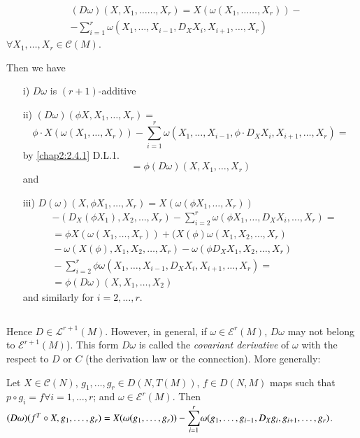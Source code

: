 \begin{align*}
& (D\omega)(X,X_{1},\ldots\ldots,X_{r})=X(\omega(X_{1},\ldots\ldots,X_{r}))-\\
& -\sum^{r}_{i=1}\omega (X_{1},\ldots,X_{i-1},D_{X}X_{i},X_{i+1},\ldots,X_{r})
\end{align*}
$\forall X_{1},\ldots,X_{r}\in\mathscr{C}(M)$.

Then \pageoriginale we have
\begin{itemize}
\item[i)] $D\omega$ is $(r+1)$-additive

\item[ii)] $(D\omega)(\phi X,X_{1},\ldots,X_{r})=$
$$
\phi\cdot
X(\omega(X_{1},\ldots,X_{r}))-\sum^{r}_{i=1}\omega(X_{1},\ldots,X_{i-1},\phi\cdot D_{X}X_{i},X_{i+1},\ldots,X_{r})=
$$
by \ref{chap2:2.4.1} D.L.1.
$$
=\phi(D\omega)(X,X_{1},\ldots,X_{r})
$$
and

\item[iii)] $D(\omega)(X,\phi X_{1},\ldots,X_{r})=X(\omega(\phi
  X_{1},\ldots,X_{r}))$
\begin{align*}
&-(D_{X}(\phi X_{1}),X_{2},\ldots,X_{r})-\sum^{r}_{i=2}\omega(\phi
X_{1},\ldots,D_{X}X_{i},\ldots,X_{r})=\\
&=\phi
X(\omega(X_{1},\ldots,X_{r}))+(X(\phi)\omega(X_{1},X_{2},\ldots,X_{r})\\
&{}-\omega(X(\phi),X_{1},X_{2},\ldots,X_{r})
-\omega(\phi D_{X}X_{1},X_{2},\ldots,X_{r})\\
&{}-\sum^{r}_{i=2}\phi\omega(X_{1},\ldots,X_{i-1},D_{X}X_{i},X_{i+1},\ldots,X_{r})=\\
&=\phi(D\omega)(X,X_{1},\ldots,X_{2})
\end{align*}
and similarly for $i=2,\ldots,r$.
\end{itemize}

\setcounter{subsection}{6}
\subsection{}\label{chap2:2.4.7}
Hence $D\in \mathscr{L}^{r+1}(M)$. However, in general, if $\omega\in
\mathcal{E}^{r}(M)$, $D\omega$ may not belong to
$\mathcal{E}^{r+1}(M)$). This form $D\omega$ is called the {\em
  covariant derivative} of $\omega$ with the respect to $D$ or $C$
(the derivation law or the connection). More generally:

\begin{prop*}[2.4.7 bis]\label{chap2:prop2.4.7bis}
Let $X\in \mathscr{C}(N)$, $g_{1},\ldots,g_{r}\in D(N,T(M))$, $f\in
D(N,M)$ maps such that $p\circ g_{i}=f\forall i=1,\ldots,r$; and
$\omega\in \mathscr{E}^{r}(M)$. Then $(D\omega)(f^{T}\circ
X,g_{1},\ldots,g_{r})=X(\omega(g_{1},\ldots,g_{r}))-{\displaystyle{\mathop{\sum}^{r}_{i=1}}}\omega
(g_{1},\ldots,g_{i-1},\unskip\break D_{X}g_{i}, g_{i+1},\ldots,g_{r})$.
\end{prop*}

